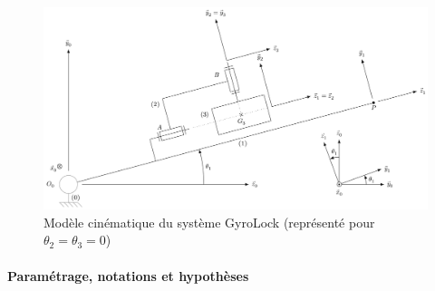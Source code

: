 \begin{figure}[ht]
\begin{center}
\includegraphics[width=0.8\linewidth]{img/fig09}
\caption{Modèle cinématique du système GyroLock (représenté pour $\theta_2=\theta_3=0$)}
\label{fig09}
\end{center}
\end{figure}


\paragraph{Paramétrage, notations et hypothèses}

